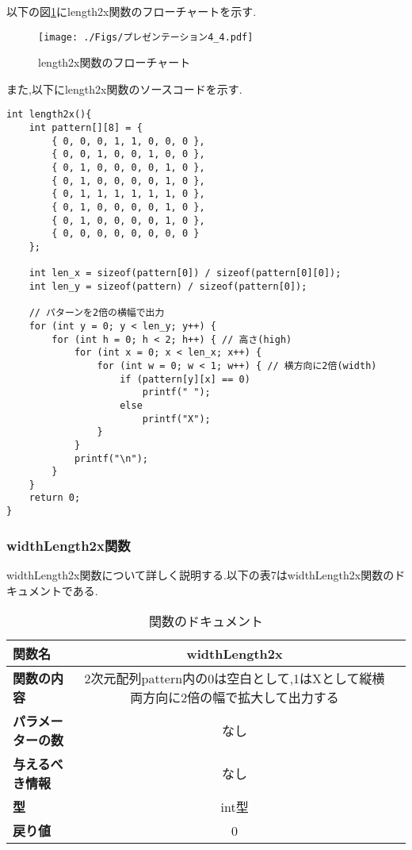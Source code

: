 \documentclass[uplatex,dvipdfmx]{jsarticle}
\begin{document}
以下の図\ref{fig:length2x関数のフローチャート}にlength2x関数のフローチャートを示す.
\newpage
\begin{figure}[h]
    \centering
    \texttt{[image: ./Figs/プレゼンテーション4\_4.pdf]}
    \caption{length2x関数のフローチャート}
    \label{fig:length2x関数のフローチャート}
\end{figure}

また,以下にlength2x関数のソースコードを示す.
\begin{lstlisting}[firstnumber = 1, caption=縦２倍の大きさで表示する, label=code] 
int length2x(){
    int pattern[][8] = {
        { 0, 0, 0, 1, 1, 0, 0, 0 },
        { 0, 0, 1, 0, 0, 1, 0, 0 },
        { 0, 1, 0, 0, 0, 0, 1, 0 },
        { 0, 1, 0, 0, 0, 0, 1, 0 },
        { 0, 1, 1, 1, 1, 1, 1, 0 },
        { 0, 1, 0, 0, 0, 0, 1, 0 },
        { 0, 1, 0, 0, 0, 0, 1, 0 },
        { 0, 0, 0, 0, 0, 0, 0, 0 }
    };
        
    int len_x = sizeof(pattern[0]) / sizeof(pattern[0][0]);
    int len_y = sizeof(pattern) / sizeof(pattern[0]);
    
    // パターンを2倍の横幅で出力
    for (int y = 0; y < len_y; y++) {
        for (int h = 0; h < 2; h++) { // 高さ(high)
            for (int x = 0; x < len_x; x++) {
                for (int w = 0; w < 1; w++) { // 横方向に2倍(width)
                    if (pattern[y][x] == 0)
                        printf(" ");
                    else
                        printf("X");
                }
            }
            printf("\n");
        }
    }
    return 0;
}
\end{lstlisting}

\subsubsection{widthLength2x関数}
widthLength2x関数について詳しく説明する.以下の表7はwidthLength2x関数のドキュメントである.

\begin{table}[h]
    \centering
    \caption{関数のドキュメント}
    \begin{tabular}{@{}lcc@{}}
    \toprule
    \textbf{関数名}         & \textbf{widthLength2x}                                        \\ \midrule
    \textbf{関数の内容}                & 2次元配列pattern内の0は空白として,1はXとして縦横両方向に2倍の幅で拡大して出力する\\ 
    \textbf{パラメーターの数}               &     なし                                \\ 
    \textbf{与えるべき情報}             &     なし                        \\ 
    \textbf{型}                &     int型                    \\ 
    \textbf{戻り値}                & 0                              \\ \bottomrule
  \end{tabular}
\end{table}
\end{document}
